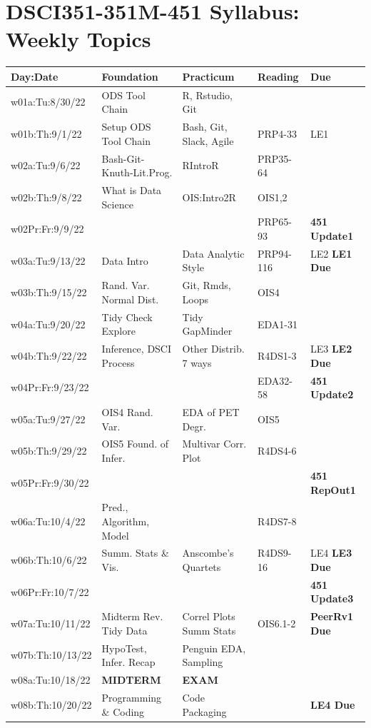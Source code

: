 \documentclass[10pt]{article} %
\begin{document}
\section{DSCI351-351M-451 Syllabus: Weekly Topics}
\begin{table}[h]
  \centering %
  \begin{tabular}{| p{2.9cm} | p{3.9cm} | p{3.9cm} | p{1.8
        cm} | p{2.5cm} |} %
	\hline %
	{\bf Day:Date} & {\bf Foundation} & {\bf Practicum} & {\bf Reading} & {\bf Due} \\ %
	\hline
	\hline %
  w01a:Tu:8/30/22 & ODS Tool Chain & R, Rstudio, Git & & \\ %
	\hline %
	w01b:Th:9/1/22 & Setup ODS Tool Chain & Bash, Git, Slack, Agile & PRP4-33 & LE1 \\
	\hline
	\hline
	w02a:Tu:9/6/22 & Bash-Git-Knuth-Lit.Prog. & RIntroR & PRP35-64  &  \\
	\hline
	w02b:Th:9/8/22 & What is Data Science & OIS:Intro2R & OIS1,2 &  \\
	\hline
	w02Pr:Fr:9/9/22 &  & & PRP65-93 & {\bf 451 Update1} \\
	\hline
	\hline
	w03a:Tu:9/13/22 & Data Intro & Data Analytic Style & PRP94-116 & LE2 {\bf LE1 Due} \\
	\hline
	w03b:Th:9/15/22 & Rand. Var. Normal Dist. & Git, Rmds, Loops & OIS4 &  \\
	\hline
	\hline
	w04a:Tu:9/20/22 & Tidy Check Explore  & Tidy GapMinder & EDA1-31 &  \\
	\hline
	w04b:Th:9/22/22 & Inference, DSCI Process & Other Distrib. 7 ways & R4DS1-3 & LE3 {\bf LE2 Due} \\
	\hline
	w04Pr:Fr:9/23/22 & & & EDA32-58 & {\bf 451 Update2} \\
	\hline
	\hline
	w05a:Tu:9/27/22 & OIS4 Rand. Var. & EDA of PET Degr. & OIS5 &  \\
	\hline
	w05b:Th:9/29/22 & OIS5 Found. of Infer. & Multivar Corr. Plot & R4DS4-6 & \\
	\hline
	w05Pr:Fr:9/30/22 &  & & & {\bf 451 RepOut1} \\
	\hline
	\hline
	w06a:Tu:10/4/22 & Pred., Algorithm, Model &   & R4DS7-8 &  \\
	\hline
	w06b:Th:10/6/22 &  Summ. Stats \& Vis. & Anscombe's Quartets &  R4DS9-16 & LE4 {\bf LE3 Due} \\
	\hline
	w06Pr:Fr:10/7/22 &  &  & & {\bf 451 Update3} \\
	\hline
	\hline
	w07a:Tu:10/11/22 & Midterm Rev. Tidy Data & Correl Plots Summ Stats  & OIS6.1-2 & {\bf PeerRv1 Due} \\
	\hline
	w07b:Th:10/13/22 & HypoTest, Infer. Recap & Penguin EDA, Sampling &  &  \\
	\hline
	\hline
	w08a:Tu:10/18/22 & {\bf MIDTERM}  &  {\bf EXAM}  &  \\
	\hline
	w08b:Th:10/20/22 & Programming \& Coding  & Code Packaging  &  & {\bf LE4 Due} \\


\end{tabular}
\end{table}
\end{document}

